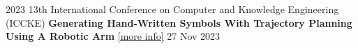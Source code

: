 
\begin{cventries}
    \cventry
    {2023 13th International Conference on Computer and Knowledge Engineering (ICCKE)}
    {\textbf {Generating Hand-Written Symbols With Trajectory Planning Using A Robotic Arm}
    \href{https://ieeexplore.ieee.org/document/10326253}{\textcolor{cobalt}{[more info]}}}
    {}
    {27 Nov 2023}
    {}
    \vspace{0.35 cm}

\end{cventries}